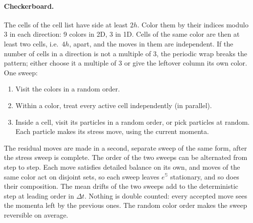 \documentclass[11pt,aps,preprint,nofootinbib,superscriptaddress,tightenlines]{revtex4-2}
\let\oldparagraph\paragraph
\renewcommand{\paragraph}{\par\bigskip\oldparagraph}
\begin{document}
\paragraph{Checkerboard.}  The cells of the cell list have side at least $2h$.
Color them by their indices modulo 3 in each direction: 9 colors in 2D, 3 in
1D.  Cells of the same color are then at least two cells, i.e.\ $4h$, apart,
and the moves in them are independent.  If the number of cells in a direction
is not a multiple of 3, the periodic wrap breaks the pattern; either choose it
a multiple of 3 or give the leftover column its own color.  One sweep:
\begin{enumerate}
\item Visit the colors in a random order.
\item Within a color, treat every active cell independently (in parallel).
\item Inside a cell, visit its particles in a random order, or pick particles
  at random.  Each particle makes its stress move, using the current momenta.
\end{enumerate}
The residual moves are made in a second, separate sweep of the same form, after
the stress sweep is complete.  The order of the two sweeps can be alternated
from step to step.
Each move satisfies detailed balance on its own, and moves of the same color
act on disjoint sets, so each sweep leaves $e^{\mathbb S}$ stationary, and so
does their composition.  The mean drifts of the two sweeps add to the
deterministic step at leading order in $\Delta t$.  Nothing
is double counted: every accepted move sees the momenta left by the previous
ones.  The random color order makes the sweep reversible on average.
\end{document}
